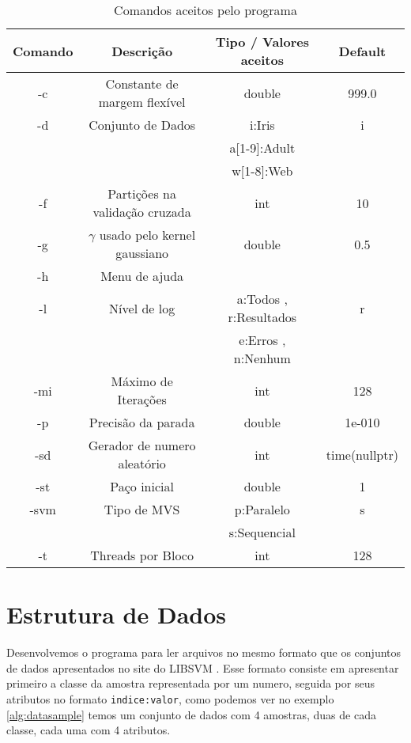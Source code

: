 \begin{table}
    \small
    \centering
    \begin{tabular}{c|c|c|c}
        Comando & Descrição & Tipo / Valores aceitos & Default \\ \hline
        -c & Constante de margem flexível & double & 999.0 \\ \hline
        -d & Conjunto de Dados &  i:Iris & i \\ 
         &  &  a[1-9]:Adult &  \\ 
         &  &  w[1-8]:Web &  \\ \hline
        -f & Partições na validação cruzada & int & 10 \\ \hline
        -g & $\gamma$ usado pelo kernel gaussiano & double & 0.5 \\ \hline
        -h & Menu de ajuda & & \\ \hline
        -l & Nível de log & a:Todos , r:Resultados  & r \\
           & & e:Erros , n:Nenhum & \\ \hline
        -mi & Máximo de Iterações & int & 128 \\ \hline
        -p & Precisão da parada & double & 1e-010 \\ \hline
        -sd & Gerador de numero aleatório & int & time(nullptr) \\ \hline
        -st & Paço inicial & double & 1 \\ \hline
        -svm & Tipo de MVS & p:Paralelo & s \\
         &  & s:Sequencial &  \\ \hline
        -t & Threads por Bloco & int & 128 \\
    \end{tabular}
    \caption{Comandos aceitos pelo programa}
    \label{tab:commands}
\end{table}

\section{Estrutura de Dados}
Desenvolvemos o programa para ler arquivos no mesmo formato que os conjuntos de dados apresentados no site do LIBSVM \cite{art:LIBSVM}. Esse formato consiste em apresentar primeiro a classe da amostra representada por um numero, seguida por seus atributos no formato \texttt{indice:valor}, como podemos ver no exemplo \ref{alg:datasample} temos um conjunto de dados com 4 amostras, duas de cada classe, cada uma com 4 atributos.

